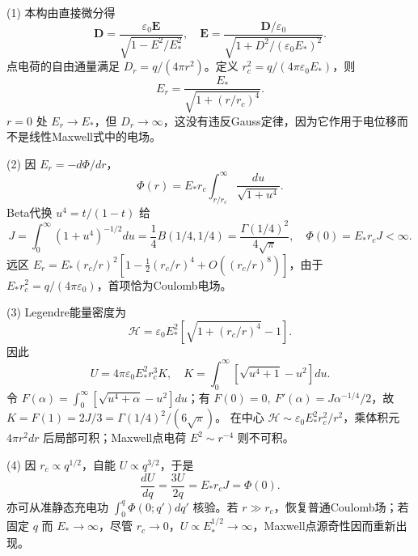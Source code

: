 (1) 本构由直接微分得
\[
\mathbf D=\frac{\varepsilon_0\mathbf E}{\sqrt{1-E^2/E_*^2}},
\quad \mathbf E=\frac{\mathbf D/\varepsilon_0}{\sqrt{1+D^2/(\varepsilon_0 E_*)^2}}.
\]
点电荷的自由通量满足 \(D_r=q/(4\pi r^2)\)。定义
\(r_c^2=q/(4\pi\varepsilon_0E_*)\)，则
\[
E_r=\frac{E_*}{\sqrt{1+(r/r_c)^4}}.
\]
\(r=0\) 处 \(E_r\to E_*\)，但 \(D_r\to\infty\)，这没有违反Gauss定律，因为它作用于电位移而不是线性Maxwell式中的电场。

(2) 因 \(E_r=-d\Phi/dr\)，
\[
\Phi(r)=E_*r_c\int_{r/r_c}^\infty\frac{du}{\sqrt{1+u^4}}.
\]
Beta代换 \(u^4=t/(1-t)\) 给
\[
J=\int_0^\infty(1+u^4)^{-1/2}du
=\frac14B(1/4,1/4)=\frac{\Gamma(1/4)^2}{4\sqrt\pi},
\quad \Phi(0)=E_*r_cJ<\infty.
\]
远区 \(E_r=E_*(r_c/r)^2[1-\tfrac12(r_c/r)^4+O((r_c/r)^8)]\)，由于 \(E_*r_c^2=q/(4\pi\varepsilon_0)\)，首项恰为Coulomb电场。

(3) Legendre能量密度为
\[
\mathcal H=\varepsilon_0 E_*^2[\sqrt{1+(r_c/r)^4}-1].
\]
因此
\[
U=4\pi\varepsilon_0E_*^2r_c^3 K,\quad
K=\int_0^\infty[\sqrt{u^4+1}-u^2]du.
\]
令 \(F(\alpha)=\int_0^\infty[\sqrt{u^4+\alpha}-u^2]du\)；有
\(F(0)=0,\ F'(\alpha)=J\alpha^{-1/4}/2\)，故
\(K=F(1)=2J/3=\Gamma(1/4)^2/(6\sqrt\pi)\)。
在中心 \(\mathcal H\sim\varepsilon_0E_*^2r_c^2/r^2\)，乘体积元 \(4\pi r^2dr\) 后局部可积；Maxwell点电荷 \(E^2\sim r^{-4}\) 则不可积。

(4) 因 \(r_c\propto q^{1/2}\)，自能 \(U\propto q^{3/2}\)，于是
\[
\frac{dU}{dq}=\frac{3U}{2q}=E_*r_cJ=\Phi(0).
\]
亦可从准静态充电功 \(\int_0^q\Phi(0;q')dq'\) 核验。若 \(r\gg r_c\)，恢复普通Coulomb场；若固定 \(q\) 而 \(E_*\to\infty\)，尽管 \(r_c\to0\)，\(U\propto E_*^{1/2}\to\infty\)，Maxwell点源奇性因而重新出现。
